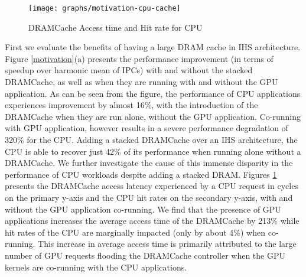 \begin{figure}[htbp]
   \texttt{[image: graphs/motivation-cpu-cache]}
   \caption{DRAMCache Access time and Hit rate for CPU}
   \label{fig:motivation-cpu-cache}
\end{figure}
First we evaluate the benefits of having a large DRAM cache in IHS architecture. Figure \ref{motivation}(a) presents the performance
improvement (in terms of speedup over harmonic mean of IPCs) with and without
the stacked DRAMCache, as well as when they are running with and without the GPU application. As can be seen from the figure,
the performance of CPU applications experiences improvement by almost 16\%, with the introduction 
of the DRAMCache when they are run alone, without the GPU application. Co-running with GPU application, however results in a severe performance degradation of 320\% for the CPU. 
Adding a stacked DRAMCache over an IHS architecture, the CPU is able to recover just 42\% of its performance when running alone without a DRAMCache. 
We further investigate the cause of this immense disparity in the performance of CPU workloads despite adding a stacked DRAM. Figures \ref{fig:motivation-cpu-cache} presents the DRAMCache access latency experienced by a CPU request in cycles on the primary y-axis and the CPU hit rates on the secondary y-axis, with and without the GPU application co-running. We find that the presence of GPU applications increases the average access time of the DRAMCache by 213\% while hit rates of the CPU are marginally impacted (only by about 4\%) when co-running.
This increase in average access time is primarily attributed to the large
number of GPU requests flooding the DRAMCache controller when the GPU kernels are co-running with the CPU applications.

